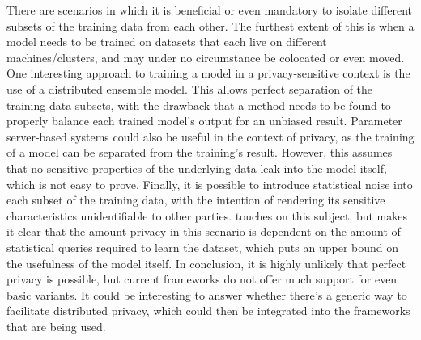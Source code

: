 There are scenarios in which it is beneficial or even mandatory to isolate different subsets of the training data from each other. The furthest extent of this is when a model needs to be trained on datasets that each live on different machines/clusters, and may under no circumstance be colocated or even moved.
One interesting approach to training a model in a privacy-sensitive context is the use of a distributed ensemble model. This allows perfect separation of the training data subsets, with the drawback that a method needs to be found to properly balance each trained model's output for an unbiased result.
Parameter server-based systems could also be useful in the context of privacy, as the training of a model can be separated from the training's result. However, this assumes that no sensitive properties of the underlying data leak into the model itself, which is not easy to prove.
Finally, it is possible to introduce statistical noise into each subset of the training data, with the intention of rendering its sensitive characteristics unidentifiable to other parties. \citet{Bal12} touches on this subject, but makes it clear that the amount privacy in this scenario is dependent on the amount of statistical queries required to learn the dataset, which puts an upper bound on the usefulness of the model itself.
In conclusion, it is highly unlikely that perfect privacy is possible, but current frameworks do not offer much support for even basic variants. It could be interesting to answer whether there's a generic way to facilitate distributed privacy, which could then be integrated into the frameworks that are being used.

